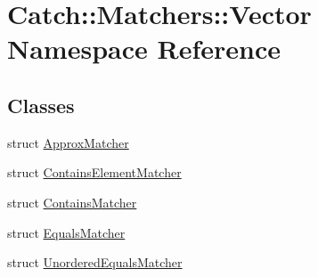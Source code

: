 \hypertarget{namespace_catch_1_1_matchers_1_1_vector}{}\section{Catch\+::Matchers\+::Vector Namespace Reference}
\label{namespace_catch_1_1_matchers_1_1_vector}
\subsection*{Classes}
\begin{DoxyCompactItemize}
\item 
struct \mbox{\hyperlink{struct_catch_1_1_matchers_1_1_vector_1_1_approx_matcher}{Approx\+Matcher}}
\item 
struct \mbox{\hyperlink{struct_catch_1_1_matchers_1_1_vector_1_1_contains_element_matcher}{Contains\+Element\+Matcher}}
\item 
struct \mbox{\hyperlink{struct_catch_1_1_matchers_1_1_vector_1_1_contains_matcher}{Contains\+Matcher}}
\item 
struct \mbox{\hyperlink{struct_catch_1_1_matchers_1_1_vector_1_1_equals_matcher}{Equals\+Matcher}}
\item 
struct \mbox{\hyperlink{struct_catch_1_1_matchers_1_1_vector_1_1_unordered_equals_matcher}{Unordered\+Equals\+Matcher}}
\end{DoxyCompactItemize}
